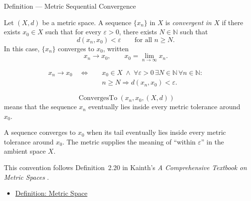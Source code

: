 \begin{definitionbox}{Definition --- Metric Sequential Convergence}
\begin{definition}
\label{def:metric-sequential-convergence}
Let \((X,d)\) be a metric space.  A sequence \(\{x_n\}\) in \(X\) is
\emph{convergent in \(X\)} if there exists \(x_0\in X\) such that for every
\(\varepsilon>0\), there exists \(N\in\mathbb{N}\) such that
\[
  d(x_n,x_0)<\varepsilon
  \qquad\text{for all } n\geq N.
\]
In this case, \(\{x_n\}\) converges to \(x_0\), written
\[
  x_n\to x_0,
  \qquad
  x_0=\lim_{n\to\infty}x_n.
\]
\end{definition}
\end{definitionbox}

\begin{remark*}
\[
\begin{aligned}
x_n\to x_0
\quad\Longleftrightarrow\quad
&x_0\in X
\;\land\;
\forall\varepsilon>0\,\exists N\in\mathbb{N}\,\forall n\in\mathbb{N}{:}
\\
&n\geq N
\Longrightarrow
d(x_n,x_0)<\varepsilon.
\end{aligned}
\]
\end{remark*}

\begin{remark*}
\[
\operatorname{ConvergesTo}(x_n,x_0,(X,d))
\]
means that the sequence \(x_n\) eventually lies inside every metric tolerance
around \(x_0\).
\end{remark*}

\begin{remark*}[Interpretation]
A sequence converges to \(x_0\) when its tail eventually lies inside every
metric tolerance around \(x_0\).  The metric supplies the meaning of
``within \(\varepsilon\)'' in the ambient space \(X\).
\end{remark*}

\begin{remark*}
This convention follows Definition~2.20 in Kainth's
\emph{A Comprehensive Textbook on Metric Spaces}
\cite{KainthComprehensiveMetricSpaces2023}.
\end{remark*}

\begin{dependencies}
\begin{itemize}
  \item \hyperref[def:metric-space]{Definition: Metric Space}
\end{itemize}
\end{dependencies}

